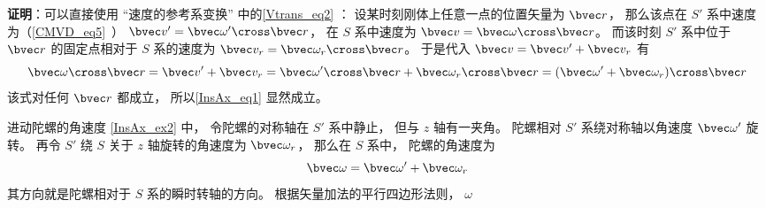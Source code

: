 \textbf{证明}：可以直接使用 “速度的参考系变换” 中的\autoref{Vtrans_eq2} ： 设某时刻刚体上任意一点的位置矢量为 $\bvec r$， 那么该点在 $S'$ 系中速度为（\autoref{CMVD_eq5}~） $\bvec v' = \bvec\omega'\cross\bvec r$， 在 $S$ 系中速度为 $\bvec v = \bvec\omega\cross\bvec r$。 而该时刻 $S'$ 系中位于 $\bvec r$ 的固定点相对于 $S$ 系的速度为 $\bvec v_r = \bvec\omega_r\cross\bvec r$。 于是代入 $\bvec v = \bvec v' + \bvec v_r$ 有
\begin{equation}
\bvec\omega\cross\bvec r = \bvec v' + \bvec v_r = \bvec\omega'\cross\bvec r + \bvec\omega_r\cross\bvec r
= (\bvec\omega' + \bvec\omega_r)\cross\bvec r
\end{equation}
该式对任何 $\bvec r$ 都成立， 所以\autoref{InsAx_eq1} 显然成立。

\begin{example}{进动陀螺的角速度}\label{InsAx_ex1}
\autoref{InsAx_ex2} 中， 令陀螺的对称轴在 $S'$ 系中静止， 但与 $z$ 轴有一夹角。 陀螺相对 $S'$ 系绕对称轴以角速度 $\bvec \omega'$ 旋转。 再令 $S'$ 绕 $S$ 关于 $z$ 轴旋转的角速度为 $\bvec \omega_r$， 那么在 $S$ 系中， 陀螺的角速度为
\begin{equation}
\bvec \omega = \bvec \omega' + \bvec \omega_r
\end{equation}
其方向就是陀螺相对于 $S$ 系的瞬时转轴的方向。 根据矢量加法的平行四边形法则， $\omega$
\end{example}
